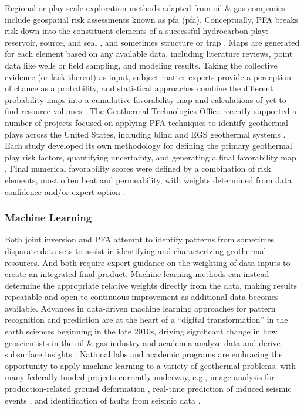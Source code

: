 Regional or play scale exploration methods adapted from oil \& gas companies include geospatial risk assessments known as \acrlong{pfa} (\acrshort{pfa}). Conceptually, PFA breaks risk down into the constituent elements of a successful hydrocarbon play: reservoir, source, and seal \citep{fraser_regional_2010,nash_adaptation_2015}, and sometimes structure or trap \citep{doust_exploration_2010}. Maps are generated for each element based on any available data, including literature reviews, point data like wells or field sampling, and modeling results. Taking the collective evidence (or lack thereof) as input, subject matter experts provide a perception of chance as a probability, and statistical approaches combine the different probability maps into a cumulative favorability map and calculations of yet-to-find resource volumes \citep{lottaroli_evaluating_2018}. The Geothermal Technologies Office recently supported a number of projects focused on applying PFA techniques to identify geothermal plays across the United States, including blind and EGS geothermal systems \citep{eeri_play_2014}. Each study developed its own methodology for defining the primary geothermal play risk factors, quantifying uncertainty, and generating a final favorability map \citep{faulds_discovering_2019, jordan_low_2016, nash_phase_2017, wannamaker_structurally_2016}. Final numerical favorability scores were defined by a combination of risk elements, most often heat and permeability, with weights determined from data confidence and/or expert option \citep{garchar_geothermal_2016}.

\subsubsection{Machine Learning}

Both joint inversion and PFA attempt to identify patterns from sometimes disparate data sets to assist in identifying and characterizing geothermal resources. And both require expert guidance on the weighting of data inputs to create an integrated final product. Machine learning methods can instead determine the appropriate relative weights directly from the data, making results repeatable and open to continuous improvement as additional data becomes available. Advances in data-driven machine learning approaches for pattern recognition and prediction are at the heart of a “digital transformation” in the earth sciences beginning in the late 2010s, driving significant change in how geoscientists in the oil \& gas industry and academia analyze data and derive subsurface insights \citep{gunderson_recent_2020}. National labs and academic programs are embracing the opportunity to apply machine learning to a variety of geothermal problems, with many federally-funded projects currently underway, e.g., image analysis for production-related ground deformation \citep{cavur_dinsar_2021}, real-time prediction of induced seismic events \citep{small_theory_2019}, and identification of faults from seismic data \citep{gao_delineating_2021}.

